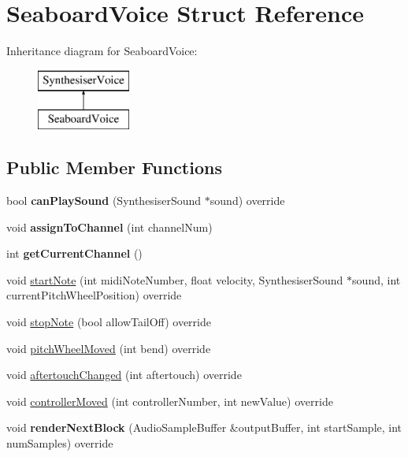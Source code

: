 \hypertarget{struct_seaboard_voice}{\section{Seaboard\-Voice Struct Reference}
\label{struct_seaboard_voice}
}
Inheritance diagram for Seaboard\-Voice\-:\begin{figure}[H]
\begin{center}
\leavevmode
\includegraphics[height=2.000000cm]{struct_seaboard_voice}
\end{center}
\end{figure}
\subsection*{Public Member Functions}
\begin{DoxyCompactItemize}
\item 
\hypertarget{struct_seaboard_voice_a183492fcd78d01ff3953f11afad77f38}{bool {\bfseries can\-Play\-Sound} (Synthesiser\-Sound $\ast$sound) override}\label{struct_seaboard_voice_a183492fcd78d01ff3953f11afad77f38}

\item 
\hypertarget{struct_seaboard_voice_a4a5e73cc70fcd4ffbb85b92832b09d52}{void {\bfseries assign\-To\-Channel} (int channel\-Num)}\label{struct_seaboard_voice_a4a5e73cc70fcd4ffbb85b92832b09d52}

\item 
\hypertarget{struct_seaboard_voice_a19ebdb5c571e624bdd42b3492976ef4b}{int {\bfseries get\-Current\-Channel} ()}\label{struct_seaboard_voice_a19ebdb5c571e624bdd42b3492976ef4b}

\item 
void \hyperlink{struct_seaboard_voice_ac37fe69fe90f5c6f5f94e5e1fd6eadca}{start\-Note} (int midi\-Note\-Number, float velocity, Synthesiser\-Sound $\ast$sound, int current\-Pitch\-Wheel\-Position) override
\item 
void \hyperlink{struct_seaboard_voice_a5f939f503e0cd2804a05c6f5c24cf80f}{stop\-Note} (bool allow\-Tail\-Off) override
\item 
void \hyperlink{struct_seaboard_voice_ab2ad0ecedab846f4114bd36759587a31}{pitch\-Wheel\-Moved} (int bend) override
\item 
void \hyperlink{struct_seaboard_voice_a2155c54e1ec50cc644d0f9d7f35a2a45}{aftertouch\-Changed} (int aftertouch) override
\item 
void \hyperlink{struct_seaboard_voice_a06d47adb23ed8eacc4917264e35355c8}{controller\-Moved} (int controller\-Number, int new\-Value) override
\item 
\hypertarget{struct_seaboard_voice_a2398839d0cffc137a2512669b9f0938f}{void {\bfseries render\-Next\-Block} (Audio\-Sample\-Buffer \&output\-Buffer, int start\-Sample, int num\-Samples) override}\label{struct_seaboard_voice_a2398839d0cffc137a2512669b9f0938f}

\end{DoxyCompactItemize}


